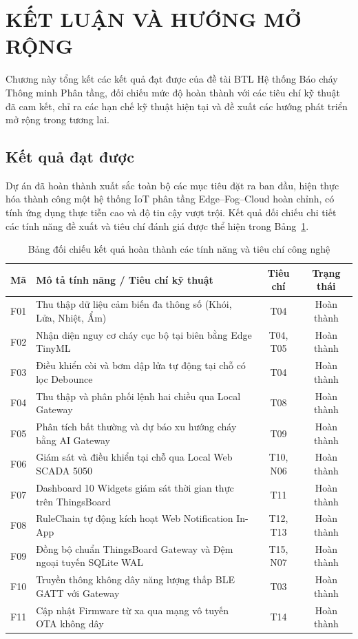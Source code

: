 \section{KẾT LUẬN VÀ HƯỚNG MỞ RỘNG}

Chương này tổng kết các kết quả đạt được của đề tài BTL Hệ thống Báo cháy Thông minh Phân tầng, đối chiếu mức độ hoàn thành với các tiêu chí kỹ thuật đã cam kết, chỉ ra các hạn chế kỹ thuật hiện tại và đề xuất các hướng phát triển mở rộng trong tương lai.

\subsection{Kết quả đạt được}
Dự án đã hoàn thành xuất sắc toàn bộ các mục tiêu đặt ra ban đầu, hiện thực hóa thành công một hệ thống IoT phân tầng Edge--Fog--Cloud hoàn chỉnh, có tính ứng dụng thực tiễn cao và độ tin cậy vượt trội. Kết quả đối chiếu chi tiết các tính năng đề xuất và tiêu chí đánh giá được thể hiện trong Bảng~\ref{tab:conclusion_results}.

\begin{table}[H]
\centering
\caption{Bảng đối chiếu kết quả hoàn thành các tính năng và tiêu chí công nghệ}
\label{tab:conclusion_results}
\small
\begin{tabular}{|c|p{7cm}|c|c|}
\hline
\textbf{Mã} & \textbf{Mô tả tính năng / Tiêu chí kỹ thuật} & \textbf{Tiêu chí} & \textbf{Trạng thái} \\ \hline
F01 & Thu thập dữ liệu cảm biến đa thông số (Khói, Lửa, Nhiệt, Ẩm) & T04 & Hoàn thành \\ \hline
F02 & Nhận diện nguy cơ cháy cục bộ tại biên bằng Edge TinyML & T04, T05 & Hoàn thành \\ \hline
F03 & Điều khiển còi và bơm dập lửa tự động tại chỗ có lọc Debounce & T04 & Hoàn thành \\ \hline
F04 & Thu thập và phân phối lệnh hai chiều qua Local Gateway & T08 & Hoàn thành \\ \hline
F05 & Phân tích bất thường và dự báo xu hướng cháy bằng AI Gateway & T09 & Hoàn thành \\ \hline
F06 & Giám sát và điều khiển tại chỗ qua Local Web SCADA 5050 & T10, N06 & Hoàn thành \\ \hline
F07 & Dashboard 10 Widgets giám sát thời gian thực trên ThingsBoard & T11 & Hoàn thành \\ \hline
F08 & RuleChain tự động kích hoạt Web Notification In-App & T12, T13 & Hoàn thành \\ \hline
F09 & Đồng bộ chuẩn ThingsBoard Gateway và Đệm ngoại tuyến SQLite WAL & T15, N07 & Hoàn thành \\ \hline
F10 & Truyền thông không dây năng lượng thấp BLE GATT với Gateway & T03 & Hoàn thành \\ \hline
F11 & Cập nhật Firmware từ xa qua mạng vô tuyến OTA không dây & T14 & Hoàn thành \\ \hline
\end{tabular}
\end{table}

